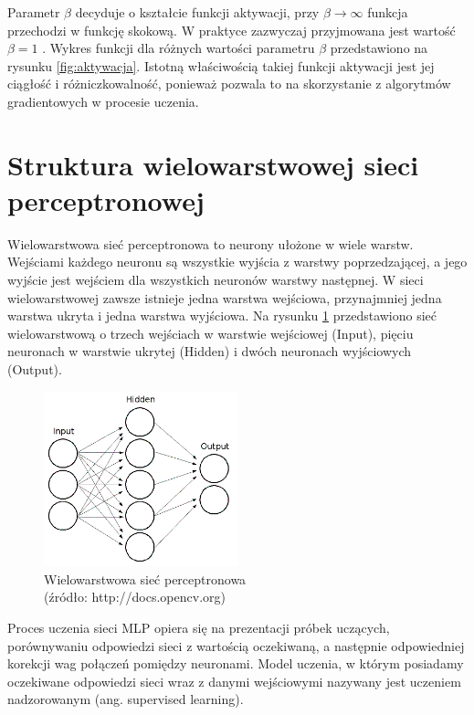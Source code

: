 Parametr $\beta$ decyduje o kształcie funkcji aktywacji, przy $\beta \rightarrow \infty$ funkcja przechodzi w funkcję skokową. W praktyce zazwyczaj przyjmowana jest wartość $\beta = 1$ \cite{osow01}. Wykres funkcji dla różnych wartości parametru $\beta$ przedstawiono na rysunku \ref{fig:aktywacja}. Istotną właściwością takiej funkcji aktywacji jest jej ciągłość i różniczkowalność, ponieważ pozwala to na skorzystanie z algorytmów gradientowych w procesie uczenia.



\section{Struktura wielowarstwowej sieci perceptronowej}
\label{Sec:ThMLP}
Wielowarstwowa sieć perceptronowa to neurony ułożone w wiele warstw. Wejściami każdego neuronu są wszystkie wyjścia z warstwy poprzedzającej, a jego wyjście jest wejściem dla wszystkich neuronów warstwy następnej. W sieci wielowarstwowej zawsze istnieje jedna warstwa wejściowa, przynajmniej jedna warstwa ukryta i jedna warstwa wyjściowa. Na rysunku \ref{fig:mlp02} przedstawiono sieć wielowarstwową o trzech wejściach w warstwie wejściowej (Input), pięciu neuronach w warstwie ukrytej (Hidden) i dwóch neuronach wyjściowych (Output).

\begin{figure}[H]
\begin{center}
\includegraphics[width=0.5\textwidth]{mlp02.png}
\caption{Wielowarstwowa sieć perceptronowa \\ (źródło: http://docs.opencv.org)}
\label{fig:mlp02}
\end{center}
\end{figure}

Proces uczenia sieci MLP opiera się na prezentacji próbek uczących, porównywaniu odpowiedzi sieci z wartością oczekiwaną, a następnie odpowiedniej korekcji wag połączeń pomiędzy neuronami. Model uczenia, w którym posiadamy oczekiwane odpowiedzi sieci wraz z danymi wejściowymi nazywany jest uczeniem nadzorowanym (ang. supervised learning). 




